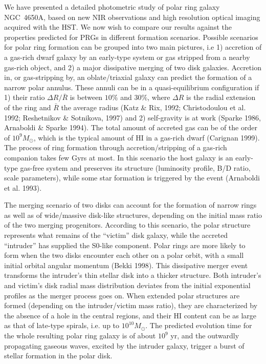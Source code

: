 \documentclass[preprint]{aastex}
\begin{document}
We have presented a detailed photometric study of 
polar ring galaxy NGC~4650A, based on new NIR observations and
high resolution optical imaging acquired with the HST. 
We now wish to compare our results against
the properties predicted for PRGs in different formation scenarios.
Possible scenarios for polar ring formation can be grouped into two main 
pictures, i.e  1) accretion of
a gas-rich dwarf galaxy by an early-type system or gas stripped from a nearby 
gas-rich object, and 2) a major dissipative merging of two disk galaxies.
Accretion in, or gas-stripping by, an oblate/triaxial galaxy
can predict the formation of a narrow polar annulus. 
These annuli can be in a quasi-equilibrium 
configuration if 1) their ratio $\Delta R / \bar R$ is between $10\%$ and $30\%$, 
where $\Delta R$ is the radial extension of the ring and $\bar R$ the 
average radius (Katz \& Rix, 1992; Christodoulou et al. 1992; 
Reshetnikov \& Sotnikova, 1997) 
and 2) self-gravity is at work (Sparke 1986, Arnaboldi \& Sparke 1994).
The total amount of accreted gas can be of the order of $10^{9} M_\odot$, 
which is the typical amount of HI in a gas-rich dwarf (Carignan 1999).
The process of ring formation through accretion/stripping 
of a gas-rich companion takes few Gyrs at most. In this scenario
the host galaxy is an early-type gas-free system and preserves its 
structure (luminosity profile, B/D ratio, scale parameters), while some 
star formation is triggered by the event (Arnaboldi et al. 1993).

The merging scenario of two disks can account for
the formation of narrow rings as well as of wide/massive disk-like
structures, depending on the initial mass ratio of the two merging
progenitors. According to this scenario, 
the polar structure represents what remains of the ``victim''
disk galaxy, while the accreted ``intruder'' has supplied the S0-like 
component.
Polar rings are more likely to form when the two disks 
encounter each other on a polar orbit,
with a small initial orbital angular momentum (Bekki 1998). 
This dissipative merger event transforms the intruder's thin stellar disk 
into a thicker structure. Both intruder's and 
victim's disk radial mass distribution deviates from the initial exponential 
profiles as the merger process goes on.
When extended polar structures are formed (depending on the 
intruder/victim mass ratio), they are characterized 
by the absence of a hole in the central regions, and their 
HI content can be as large as that of late-type 
spirals, i.e. up to $10^{10} M_\odot$.  
The predicted evolution time for the whole resulting polar ring galaxy is of 
about $10^{9}$ yr,  and the outwardly propagating gaseous waves, 
excited by the intruder galaxy, trigger a burst of stellar formation 
in the polar disk.
\end{document}

